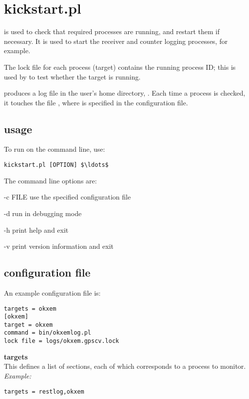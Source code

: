 \section{kickstart.pl \label{s:kickstart}}

 is used to check that required processes are running,
and restart them if necessary. 
It is used to start the receiver and counter logging processes, for example.

The lock file for each process (target) contains the running process ID; 
this is used by  to test whether the target is running.

 produces a log file in the user's home directory, . Each time 
a process is checked, it touches the file , where  is
specified in the configuration file.

\subsection{usage}

To run  on the command line, use:
\begin{lstlisting}[mathescape=true]
kickstart.pl [OPTION] $\ldots$
\end{lstlisting}
The command line options are:
\begin{description*}
	\item[-c  FILE] use the specified configuration file
	\item[-d]	run in debugging mode
	\item[-h]	print help and exit
	\item[-v]	print version information and exit
\end{description*}

\subsection{configuration file}

An example configuration file is:
\begin{lstlisting}
targets = okxem
[okxem]
target = okxem
command = bin/okxemlog.pl 
lock file = logs/okxem.gpscv.lock
\end{lstlisting}

{\bfseries targets}\\
This defines a list of sections, each of which corresponds to a process to monitor.\\
\textit{Example:}
\begin{lstlisting}
targets = restlog,okxem
\end{lstlisting}

